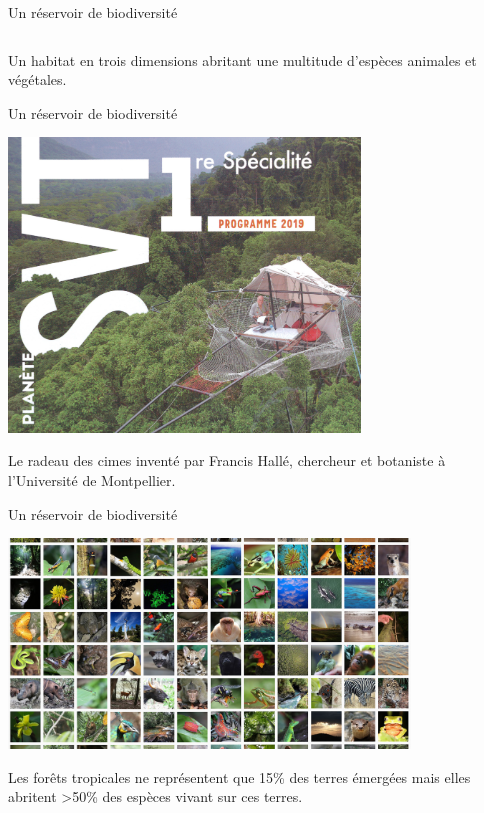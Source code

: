 \documentclass[10pt,table,dvipsnames,compress]{beamer}
\begin{document}
\begin{frame}[label={sec:org8633800}]{Un réservoir de biodiversité}
\begin{columns}
\begin{column}{0.5\columnwidth}
\begin{center}
\end{center}
\end{column}
\end{columns}
Un habitat en trois dimensions abritant une multitude d'espèces animales et végétales.
\end{frame}
\begin{frame}[label={sec:org8f8c544}]{Un réservoir de biodiversité}
\begin{center}
\includegraphics[width=0.7\textwidth]{figs/planete-svt.png}
\end{center}

Le radeau des cimes inventé par Francis Hallé, chercheur et botaniste à l'Université de Montpellier.
\end{frame}
\begin{frame}[label={sec:org5f715ad}]{Un réservoir de biodiversité}
\begin{center}
\includegraphics[width=0.8\textwidth]{figs/biodiversity-in-tropical-forests-2.jpg}
\end{center}

Les forêts tropicales ne représentent que 15\% des terres émergées mais elles abritent >50\% des espèces vivant sur ces terres.
\end{frame}
\end{document}
